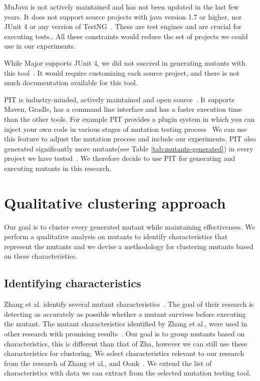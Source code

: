\documentclass[conference,draftclsnofoot,onecolumn]{IEEEtran}
\begin{document}
MuJava is not actively maintained and has not been updated in the last few years.
It does not support source projects with java version 1.7 or higher, nor JUnit 4 or any version of TestNG~\cite{mujava}.
These are test engines and are crucial for executing tests..
All these constraints would reduce the set of projects we could use in our experiments.

While Major supports JUnit 4,
we did not succeed in generating mutants with this tool~\cite{thesis}.
It would require customizing each source project, and
there is not much documentation available for this tool.

PIT is industry-minded, actively maintained and open source~\cite{Kintis2016AnalysingStudy}.
It supports Maven, Gradle, has a command line interface and has a faster execution time than the other tools.
For example PIT provides a plugin system in which you can inject your own code in various stages of mutation testing process~\cite{pit}
We can use this feature to adjust the mutation process and include our experiments.
PIT also generated significantly more mutants(see Table \ref{tab:mutants-generated}) in every project we have tested~\cite{thesis}.
We therefore decide to use PIT for generating and executing mutants in this research.

\section{Qualitative clustering approach}
\label{ch:reserach_question1}
Our goal is to cluster every generated mutant while maintaining effectiveness. We perform a qualitative analysis on mutants to identify characteristics that represent the mutants and we devise a methodology for clustering mutants based on these characteristics. 

\subsection{Identifying characteristics}
\label{ch:identifying_characteristics}
Zhang et al. identify several mutant characteristics~\cite{Zhang2019PredictiveTesting}. 
The goal of their research is detecting as accurately as possible whether a mutant survives before executing the mutant.
The mutant characteristics identified by Zhang et al., were used in other research with promising results~\cite{Oonk2021}.
Our goal is to group mutants based on characteristics, this is different than that of Zha, however we can still use these characteristics for clustering.
We select characteristics relevant to our research from the research of Zhang et al., and Oonk~\cite{Oonk2021}.
We extend the list of characteristics with data we can extract from the selected mutation testing tool. 
\end{document}
